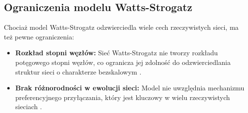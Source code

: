 \subsection{Ograniczenia modelu Watts-Strogatz}
Chociaż model Watts-Strogatz odzwierciedla wiele cech rzeczywistych sieci, ma też pewne ograniczenia:
\begin{itemize}
    \item \textbf{Rozkład stopni węzłów:} Sieć Watts-Strogatz nie tworzy rozkładu potęgowego stopni węzłów, co ogranicza jej zdolność do odzwierciedlania struktur sieci o charakterze bezskalowym \cite{Barabasi1999}.
    \item \textbf{Brak różnorodności w ewolucji sieci:} Model nie uwzględnia mechanizmu preferencyjnego przyłączania, który jest kluczowy w wielu rzeczywistych sieciach \cite{Newman2003}.
\end{itemize}
